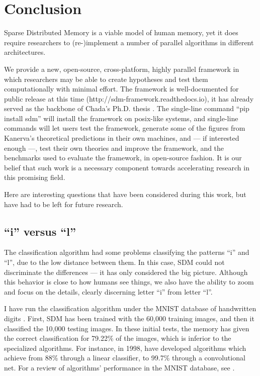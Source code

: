 \chapter{Conclusion}

Sparse Distributed Memory is a viable model of human memory, yet it does require researchers to (re-)implement a number of parallel algorithms in different architectures.

We provide a new, open-source, cross-platform, highly parallel framework in which researchers may be able to create hypotheses and test them computationally with minimal effort. The framework is well-documented for public release at this time (http://sdm-framework.readthedocs.io), it has already served as the backbone of Chada's Ph.D. thesis \citep{chada2016you}. The single-line command ``pip install sdm'' will install the framework on posix-like systems, and single-line commands will let users test the framework, generate some of the figures from Kanerva's theoretical predictions in their own machines, and --- if interested enough ---, test their own theories and improve the framework, and the benchmarks used to evaluate the framework, in open-source fashion. It is our belief that such work is a necessary component towards accelerating research in this promising field.

Here are interesting questions that have been considered during this work, but have had to be left for future research.

\section{``i'' versus ``l''}

The classification algorithm had some problems classifying the patterns ``i'' and ``l'', due to the low distance between them. In this case, SDM could not discriminate the differences --- it has only considered the big picture. Although this behavior is close to how humans see things, we also have the ability to zoom and focus on the details, clearly discerning letter ``i'' from letter ``l''.

I have run the classification algorithm under the MNIST database of handwritten digits \citep{deng2012mnist}. First, SDM has been trained with the 60,000 training images, and then it classified the 10,000 testing images. In these initial tests, the memory has given the correct classification for 79.22\% of the images, which is inferior to the specialized algorithms. For instance, in 1998, \citet{lecun1998gradient} have developed algorithms which achieve from 88\% through a linear classifier, to 99.7\% through a convolutional net. For a review of algorithms' performance in the MNIST database, see \cite{mnist}.

